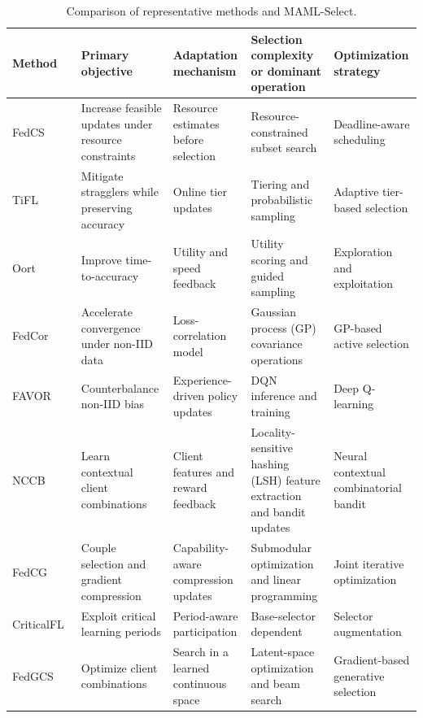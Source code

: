 \documentclass[journal]{IEEEtran}
\begin{document}
\begin{table}[!t]
    \color{black}
    \caption{Comparison of representative methods and MAML-Select.}
    \label{tab:related_work_comparison}
    \centering
    \scriptsize
    \setlength{\tabcolsep}{3pt}
    \renewcommand{\arraystretch}{0.98}
    \begin{tabularx}{\textwidth}{lXXXX}
        \toprule
        \textbf{Method} & \textbf{Primary objective} & \textbf{Adaptation mechanism} & \textbf{Selection complexity or dominant operation} & \textbf{Optimization strategy} \\
        \midrule
        FedCS~\cite{nishio2019client} & Increase feasible updates under resource constraints & Resource estimates before selection & Resource-constrained subset search & Deadline-aware scheduling \\
        TiFL~\cite{chai2020tifl} & Mitigate stragglers while preserving accuracy & Online tier updates & Tiering and probabilistic sampling & Adaptive tier-based selection \\
        Oort~\cite{lai2021oort} & Improve time-to-accuracy & Utility and speed feedback & Utility scoring and guided sampling & Exploration and exploitation \\
        FedCor~\cite{tang2022fedcor} & Accelerate convergence under non-IID data & Loss-correlation model & Gaussian process (GP) covariance operations & GP-based active selection \\
        FAVOR~\cite{wang2020optimizing} & Counterbalance non-IID bias & Experience-driven policy updates & DQN inference and training & Deep Q-learning \\
        NCCB~\cite{pan2024contextual} & Learn contextual client combinations & Client features and reward feedback & Locality-sensitive hashing (LSH) feature extraction and bandit updates & Neural contextual combinatorial bandit \\
        FedCG~\cite{xu2024federated} & Couple selection and gradient compression & Capability-aware compression updates & Submodular optimization and linear programming & Joint iterative optimization \\
        CriticalFL~\cite{yan2023criticalfl} & Exploit critical learning periods & Period-aware participation & Base-selector dependent & Selector augmentation \\
        FedGCS~\cite{ning2024fedgcs} & Optimize client combinations & Search in a learned continuous space & Latent-space optimization and beam search & Gradient-based generative selection \\

\end{tabularx}
\end{table}
\end{document}
